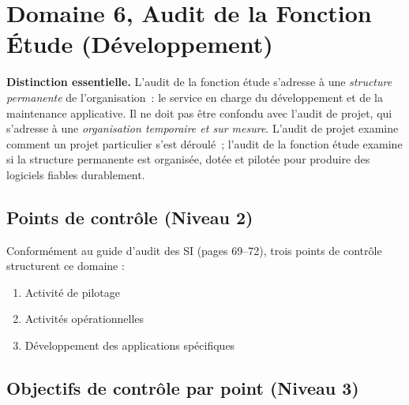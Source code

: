 \section{Domaine 6, Audit de la Fonction Étude (Développement)}
\label{sec:decomp-etude}

\begin{boxinfo}
\textbf{Distinction essentielle.} L'audit de la fonction étude s'adresse à une \textit{structure permanente} de l'organisation~: le service en charge du développement et de la maintenance applicative. Il ne doit pas être confondu avec l'audit de projet, qui s'adresse à une \textit{organisation temporaire et sur mesure}. L'audit de projet examine comment un projet particulier s'est déroulé~; l'audit de la fonction étude examine si la structure permanente est organisée, dotée et pilotée pour produire des logiciels fiables durablement.
\end{boxinfo}

\subsection{Points de contrôle (Niveau 2)}

Conformément au guide d'audit des SI (pages 69--72), trois points de contrôle structurent ce domaine :

\begin{enumerate}
    \item Activité de pilotage
    \item Activités opérationnelles
    \item Développement des applications spécifiques
\end{enumerate}

\subsection{Objectifs de contrôle par point (Niveau 3)}

